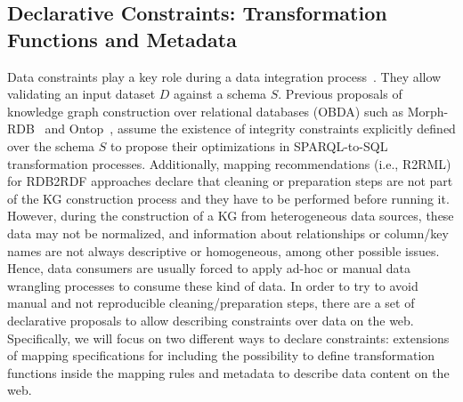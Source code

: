 \subsection{Declarative Constraints: Transformation Functions and Metadata}
Data constraints play a key role during a data integration process~\citep{cali2002data}. They allow validating an input dataset $D$ against a schema $S$. Previous proposals of knowledge graph construction over relational databases (OBDA) such as Morph-RDB~\citep{priyatna2014formalisation} and Ontop~\citep{calvanese2017ontop}, assume the existence of integrity constraints explicitly defined over the schema $S$ to propose their optimizations in SPARQL-to-SQL transformation processes. Additionally, mapping recommendations (i.e., R2RML) for RDB2RDF approaches declare that cleaning or preparation steps are not part of the KG construction process and they have to be performed before running it. However, during the construction of a KG from heterogeneous data sources, these data may not be normalized, and information about relationships or column/key names are not always descriptive or homogeneous, among other possible issues. Hence, data consumers are usually forced to apply ad-hoc or manual data wrangling processes to consume these kind of data. In order to try to avoid manual and not reproducible cleaning/preparation steps, there are a set of declarative proposals to allow describing constraints over data on the web. Specifically, we will focus on two different ways to declare constraints: extensions of mapping specifications for including the possibility to define transformation functions inside the mapping rules and metadata to describe data content on the web. 

